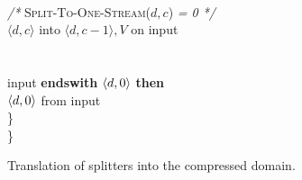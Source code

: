 \begin{figure}[t!]
\begin{minipage}{0.78\textwidth}
\tab\tab{}\\
\tab\tab{} {\it /*} \textsc{Split-To-One-Stream}($d, c$) {\it = 0 */} \\
\tab\tab\tab{} $\langle d,c \rangle$ into $\langle d,c-1\rangle,V$ on input\\
\tab\tab\tab\\
\tab\tab{}\\
\tab\tab{} input {\bf endswith} $\langle d, 0\rangle$ {\bf then}\\
\tab\tab\tab{} $\langle d, 0\rangle$ from input\\
\tab\}\\
\}
\end{minipage}
\caption[Translation of splitters into the compressed
  domain]{Translation of splitters into the compressed domain.
\protect\label{fig:translate-splitter}}
\end{figure}

